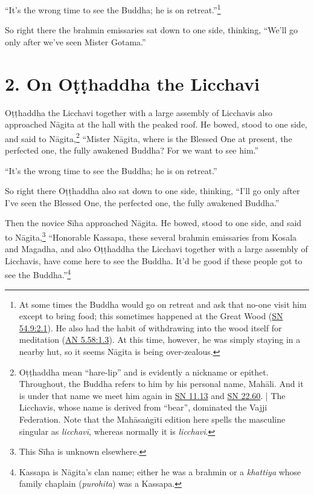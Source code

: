 \documentclass[12pt,openany]{book}%
\begin{document}
“It’s the wrong time to see the Buddha; he is on retreat.”\footnote{At some times the Buddha would go on retreat and ask that no-one visit him except to bring food; this sometimes happened at the Great Wood (\href{https://suttacentral.net/sn54.9/en/sujato\#2.1}{SN 54.9:2.1}). He also had the habit of withdrawing into the wood itself for meditation (\href{https://suttacentral.net/an5.58/en/sujato\#1.3}{AN 5.58:1.3}). At this time, however, he was simply staying in a nearby hut, so it seems \textsanskrit{Nāgita} is being over-zealous. } 

So right there the brahmin emissaries sat down to one side, thinking, “We’ll go only after we’ve seen Mister Gotama.” 

\section*{2. On \textsanskrit{Oṭṭhaddha} the Licchavi }

\textsanskrit{Oṭṭhaddha} the Licchavi together with a large assembly of Licchavis also approached \textsanskrit{Nāgita} at the hall with the peaked roof. He bowed, stood to one side, and said to \textsanskrit{Nāgita},\footnote{\textsanskrit{Oṭṭhaddha} mean “hare-lip” and is evidently a nickname or epithet. Throughout, the Buddha refers to him by his personal name, \textsanskrit{Mahāli}. And it is under that name we meet him again in \href{https://suttacentral.net/sn11.13/en/sujato}{SN 11.13} and \href{https://suttacentral.net/sn22.60/en/sujato}{SN 22.60}. | The Licchavis, whose name is derived from “bear”, dominated the Vajji Federation. Note that the \textsanskrit{Mahāsaṅgīti} edition here spells the masculine singular as \textit{\textsanskrit{licchavī}}, whereas normally it is \textit{licchavi}. } “Mister \textsanskrit{Nāgita}, where is the Blessed One at present, the perfected one, the fully awakened Buddha? For we want to see him.” 

“It’s the wrong time to see the Buddha; he is on retreat.” 

So right there \textsanskrit{Oṭṭhaddha} also sat down to one side, thinking, “I’ll go only after I’ve seen the Blessed One, the perfected one, the fully awakened Buddha.” 

Then the novice \textsanskrit{Sīha} approached \textsanskrit{Nāgita}. He bowed, stood to one side, and said to \textsanskrit{Nāgita},\footnote{This \textsanskrit{Sīha} is unknown elsewhere. } “Honorable Kassapa, these several brahmin emissaries from Kosala and Magadha, and also \textsanskrit{Oṭṭhaddha} the Licchavi together with a large assembly of Licchavis, have come here to see the Buddha. It’d be good if these people got to see the Buddha.”\footnote{Kassapa is \textsanskrit{Nāgita}’s clan name; either he was a brahmin or a \textit{khattiya} whose family chaplain (\textit{purohita}) was a Kassapa. } 
\end{document}
